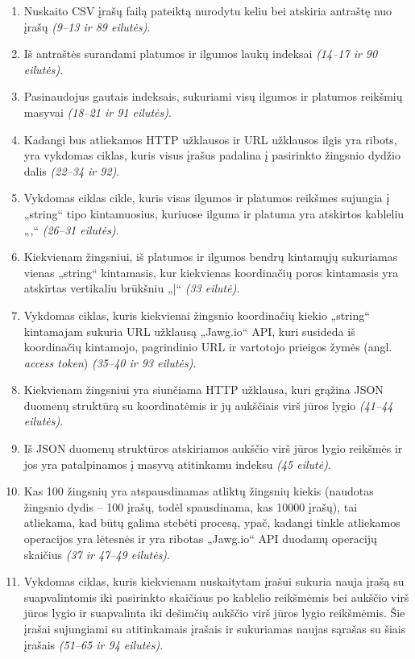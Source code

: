 \documentclass{VUMIFPSbakalaurinis}
\begin{document}
\begin{enumerate}
	\item Nuskaito CSV įrašų failą pateiktą nurodytu keliu bei atskiria antraštę nuo įrašų \textit{(9–13 ir 89 eilutės)}.
	\item Iš antraštės surandami platumos ir ilgumos laukų indeksai \textit{(14–17 ir 90 eilutės)}.
	\item Pasinaudojus gautais indeksais, sukuriami visų ilgumos ir platumos reikšmių masyvai \textit{(18–21 ir 91 eilutės)}.
	\item Kadangi bus atliekamos HTTP užklausos ir URL užklausos ilgis yra ribots, yra vykdomas ciklas, kuris visus įrašus padalina į pasirinkto žingsnio dydžio dalis \textit{(22–34 ir 92)}.
	\item Vykdomas ciklas cikle, kuris visas ilgumos ir platumos reikšmes sujungia į „string“ tipo kintamuosius, kuriuose ilguma ir platuma yra atskirtos kableliu „,“\textit{ (26–31 eilutės)}.
	\item Kiekvienam žingsniui, iš platumos ir ilgumos bendrų kintamųjų sukuriamas vienas „string“ kintamasis, kur kiekvienas koordinačių poros kintamasis yra atskirtas vertikaliu brūkšniu „|“ \textit{(33 eilutė)}.
	\item Vykdomas ciklas, kuris kiekvienai žingsnio koordinačių kiekio „string“ kintamajam sukuria URL užklausą „Jawg.io“ API, kuri susideda iš koordinačių kintamojo, pagrindinio URL ir vartotojo prieigos žymės (angl. \textit{access token}) \textit{(35–40 ir 93 eilutės)}.
	\item Kiekvienam žingsniui yra siunčiama HTTP užklausa, kuri grąžina JSON duomenų struktūrą su koordinatėmis ir jų aukščiais virš jūros lygio \textit{(41–44 eilutės)}.
	\item Iš JSON duomenų struktūros atskiriamos aukščio virš jūros lygio reikšmės ir jos yra patalpinamos į masyvą atitinkamu indeksu \textit{(45 eilutė)}.
	\item Kas 100 žingsnių yra atspausdinamas atliktų žingsnių kiekis (naudotas žingsnio dydis – 100 įrašų, todėl spausdinama, kas 10000 įrašų), tai atliekama, kad būtų galima stebėti procesą, ypač, kadangi tinkle atliekamos operacijos yra lėtesnės ir yra ribotas „Jawg.io“ API duodamų operacijų skaičius \textit{(37 ir 47–49 eilutės)}.
	\item Vykdomas ciklas, kuris kiekvienam nuskaitytam įrašui sukuria nauja įrašą su suapvalintomis iki pasirinkto skaičiaus po kablelio reikšmėmis bei aukščio virš jūros lygio ir suapvalinta iki dešimčių aukščio virš jūros lygio reikšmėmis. Šie įrašai sujungiami su atitinkamais įrašais ir sukuriamas naujas sąrašas su šiais įrašais \textit{(51–65 ir 94 eilutės)}.

\end{enumerate}
\end{document}
